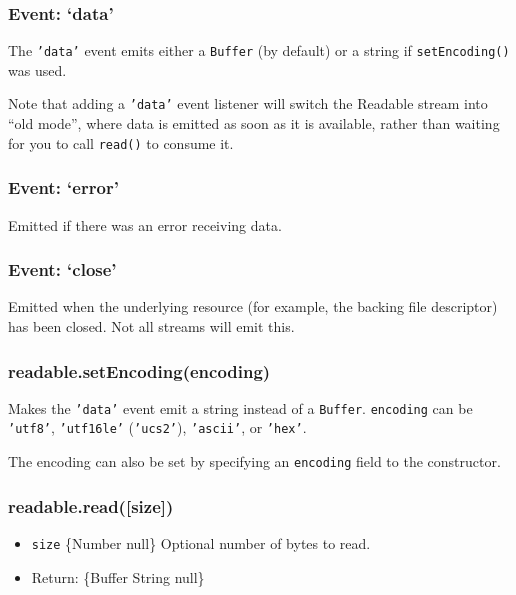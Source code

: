 \subsubsection{Event: `data'}

The \texttt{'data'} event emits either a \texttt{Buffer} (by default) or
a string if \texttt{setEncoding()} was used.

Note that adding a \texttt{'data'} event listener will switch the
Readable stream into ``old mode'', where data is emitted as soon as it
is available, rather than waiting for you to call \texttt{read()} to
consume it.

\subsubsection{Event: `error'}

Emitted if there was an error receiving data.

\subsubsection{Event: `close'}

Emitted when the underlying resource (for example, the backing file
descriptor) has been closed. Not all streams will emit this.

\subsubsection{readable.setEncoding(encoding)}

Makes the \texttt{'data'} event emit a string instead of a
\texttt{Buffer}. \texttt{encoding} can be \texttt{'utf8'},
\texttt{'utf16le'} (\texttt{'ucs2'}), \texttt{'ascii'}, or
\texttt{'hex'}.

The encoding can also be set by specifying an \texttt{encoding} field to
the constructor.

\subsubsection{readable.read({[}size{]})}

\begin{itemize}
\item
  \texttt{size} \{Number \textbar{} null\} Optional number of bytes to
  read.
\item
  Return: \{Buffer \textbar{} String \textbar{} null\}
\end{itemize}

